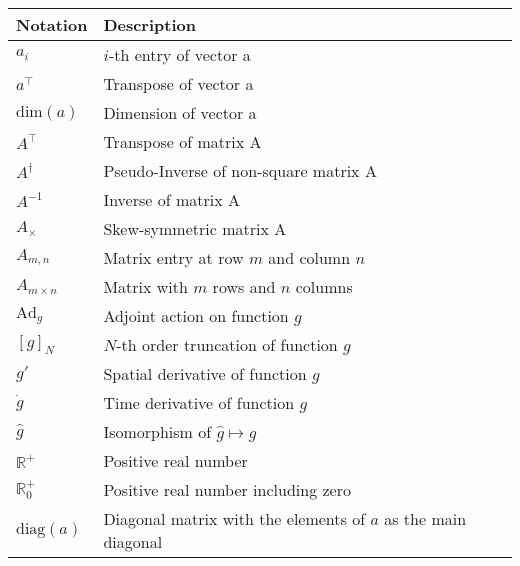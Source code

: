 \begin{spacing}{0.9}
\begin{multicols}{2}
\begin{table}[H]
\centering
    \begin{tabular}{p{1.5cm} p{5cm}} \hline
    \textbf{Notation}    &   \textbf{Description}\\ \hline
    $a_i$ & $i$-th entry of vector a \\
    $a^\top$ & Transpose of vector a \\
    $\text{dim}(a)$ & Dimension of vector a \\
    $A^\top$ & Transpose of matrix A \\
    $A^\dagger$ & Pseudo-Inverse of non-square matrix A \\
    $A^{-1}$ & Inverse of matrix A \\
    $A_\times$ & Skew-symmetric matrix A \\
    $A_{m,n}$ & Matrix entry at row $m$ and column $n$ \\
    $A_{m \times n}$ & Matrix with $m$ rows and $n$ columns \\
    $\text{Ad}_g$ & Adjoint action on function $g$\\
    $[g]_N$ & $N$-th order truncation of function $g$\\ 
    $g'$ & Spatial derivative of function $g$ \\
    $\dot{g}$ & Time derivative of function $g$ \\
    $\hat{g}$ & Isomorphism of $\hat{g} \longmapsto g$ \\
    $\mathbb{R}^+$ & Positive real number\\
    $\mathbb{R}^+_0$ & Positive real number including zero\\
    $\text{diag}(a)$ & Diagonal matrix with the elements of $a$ as the main diagonal\\ \hline
    \end{tabular}
\end{table}



\end{multicols}
\end{spacing}
